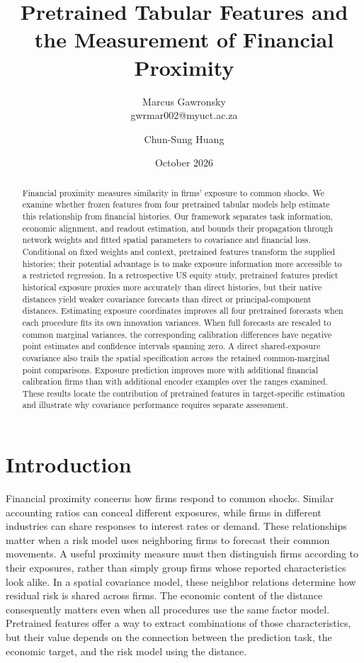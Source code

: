 \documentclass[11pt]{article}
\title{Pretrained Tabular Features and the Measurement of Financial Proximity}
\author{Marcus Gawronsky\\\small gwrmar002@myuct.ac.za
\and Chun-Sung Huang}
\date{October 2026}
\begin{document}

\maketitle
\begin{abstract}
  Financial proximity measures similarity in firms' exposure to common shocks.
  We examine whether frozen features from four pretrained tabular models help
  estimate this relationship from financial histories. Our framework
  separates task information, economic alignment, and
  readout estimation, and bounds their propagation through network weights
  and fitted spatial parameters to covariance and financial loss.
  Conditional on fixed weights and context, pretrained features
  transform the supplied histories; their potential advantage is to make
  exposure information more accessible to a restricted regression. In a
  retrospective US equity study, pretrained features predict historical exposure
  proxies more accurately than direct histories, but their native distances
  yield weaker covariance forecasts than direct or principal-component
  distances. Estimating exposure coordinates improves all four pretrained
  forecasts when each procedure fits its own innovation variances. When full
  forecasts are rescaled to common marginal variances, the corresponding
  calibration differences have negative point estimates and confidence intervals
  spanning zero. A direct shared-exposure covariance also trails the spatial
  specification across the retained common-marginal point comparisons.
  Exposure prediction improves more with additional financial
  calibration firms than with additional encoder examples over the ranges
  examined. These results locate the contribution of pretrained features in
  target-specific estimation and illustrate why covariance performance requires
  separate assessment.
\end{abstract}

\section{Introduction}\label{sec:question}
Financial proximity concerns how firms respond to common shocks. Similar
accounting ratios can conceal different exposures, while firms in different
industries can share responses to interest rates or demand. These relationships
matter when a risk model uses neighboring firms to forecast their common
movements. A useful proximity measure must then distinguish firms according to
their exposures, rather than simply group firms whose reported characteristics
look alike. In a spatial covariance model, these neighbor relations
determine how
residual risk is shared across firms.
The economic content of the distance consequently matters even when all
procedures use the same factor model. Pretrained features offer a way
to extract combinations of those
characteristics, but their value depends on the connection between the
prediction task, the economic target, and the risk model using the distance.
\end{document}
